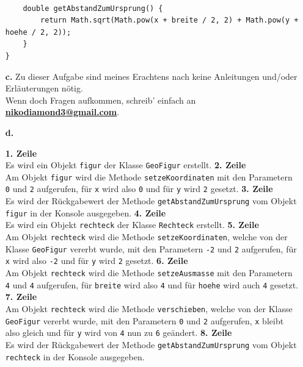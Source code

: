 \documentclass{scrartcl}   %
\begin{document}
\begin{itemize}
\begin{lstlisting}
    
    double getAbstandZumUrsprung() {
        return Math.sqrt(Math.pow(x + breite / 2, 2) + Math.pow(y + hoehe / 2, 2));
    }
}
    \end{lstlisting}
    \item[\textbf{c.}] Zu dieser Aufgabe sind meines Erachtens nach keine Anleitungen und/oder Erläuterungen nötig.\\
Wenn doch Fragen aufkommen, schreib' einfach an \textbf{\href{mailto:nikodiamond3@gmail.com}{nikodiamond3@gmail.com}}.
    \item[\textbf{d.}]
    \begin{itemize}
        \barrow \textbf{1. Zeile}\\
        Es wird ein Objekt \texttt{figur} der Klasse \texttt{GeoFigur} erstellt.
        \barrow \textbf{2. Zeile}\\
        Am Objekt \texttt{figur} wird die Methode \texttt{setzeKoordinaten} mit den Parametern \texttt{0} und \texttt{2} aufgerufen, für \texttt{x} wird also \texttt{0} und für \texttt{y} wird \texttt{2} gesetzt.
        \barrow \textbf{3. Zeile}\\
        Es wird der Rückgabewert der Methode \texttt{getAbstandZumUrsprung} vom Objekt \texttt{figur} in der Konsole ausgegeben.
        \barrow \textbf{4. Zeile}\\
        Es wird ein Objekt \texttt{rechteck} der Klasse \texttt{Rechteck} erstellt.
        \barrow \textbf{5. Zeile}\\
        Am Objekt \texttt{rechteck} wird die Methode \texttt{setzeKoordinaten}, welche von der Klasse \texttt{GeoFigur} vererbt wurde, mit den Parametern \texttt{-2} und \texttt{2} aufgerufen, für \texttt{x} wird also \texttt{-2} und für \texttt{y} wird \texttt{2} gesetzt.
        \barrow \textbf{6. Zeile}\\
        Am Objekt \texttt{rechteck} wird die Methode \texttt{setzeAusmasse} mit den Parametern \texttt{4} und \texttt{4} aufgerufen, für \texttt{breite} wird also \texttt{4} und für \texttt{hoehe} wird auch \texttt{4} gesetzt.
        \barrow \textbf{7. Zeile}\\
        Am Objekt \texttt{rechteck} wird die Methode \texttt{verschieben}, welche von der Klasse \texttt{GeoFigur} vererbt wurde, mit den Parametern \texttt{0} und \texttt{2} aufgerufen, \texttt{x} bleibt also gleich und für \texttt{y} wird von \texttt{4} nun zu \texttt{6} geändert.
        \barrow \textbf{8. Zeile}\\
        Es wird der Rückgabewert der Methode \texttt{getAbstandZumUrsprung} vom Objekt \texttt{rechteck} in der Konsole ausgegeben.

\end{itemize}
\end{itemize}
\end{document}
